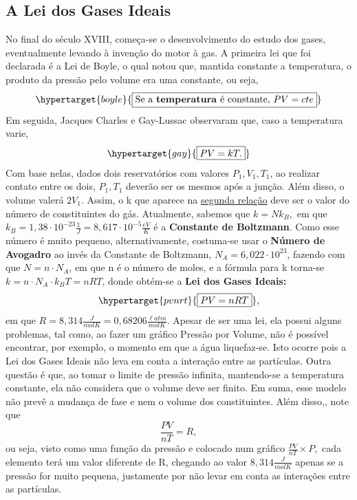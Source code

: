 \documentclass{article}
\begin{document}
\subsection{A Lei dos Gases Ideais}
  No final do século XVIII, começa-se o desenvolvimento do estudo dos gases, eventualmente levando à invenção do motor à gas. A primeira lei que foi declarada
é a Lei de Boyle, o qual notou que, mantida constante a temperatura, o produto da pressão pelo volume era uma constante, ou seja, 
  \[
    \hypertarget{boyle}{\boxed{\text{Se a \textbf{temperatura} é constante, }PV = cte}}
  \]
  Em seguida, Jacques Charles e Gay-Lussac observaram que, caso a temperatura varie, 
  \[
    \hypertarget{gay}{\boxed{PV = kT.}}
  \]
  Com base nelas, dados dois reservatórios com valores \(P_{1}, V_{1}, T_{1}\), ao realizar contato entre os dois, \(P_{1}, T_{1}\) deverão ser os mesmos após a junção.
Além disso, o volume valerá \(2V_{1}.\) Assim, o k que aparece na \hyperlink{gay}{segunda relação} deve ser o valor do número de constituintes do gás. Atualmente, sabemos que 
 \(k = Nk_{B},\) em que \(k_{B} = 1,38 \cdot 10^{-23}\frac{1}{J} = 8,617 \cdot 10^{-5}\frac{eV}{K}\) é a \textbf{Constante de Boltzmann}. Como esse número é muito pequeno, alternativamente,
costuma-se usar o \textbf{Número de Avogadro } ao invés da Constante de Boltzmann, \(N_{A} = 6,022 \cdot 10^{23}\), fazendo com que \(N = n \cdot N_{A}\), em que n é o número
de moles, e a fórmula para k torna-se \(k = n \cdot N_{A} \cdot k_{B} T = nRT\), donde obtém-se a \textbf{Lei dos Gases Ideais:}
  \[
    \hypertarget{pvnrt}{\boxed{PV = nRT}},
  \]
  em que \(R = 8,314 \frac{J}{molK} = 0,68206 \frac{\ell atm}{mol K}\). Apesar de ser uma lei, ela possui alguns problemas, tal como, ao fazer um gráfico Pressão por Volume,
não é possível encontrar, por exemplo, o momento em que a água liquefaz-se. Isto ocorre pois a Lei dos Gases Ideais não leva em conta a interação entre as partículas. Outra questão
é que, ao tomar o limite de pressão infinita, mantendo-se a temperatura constante, ela não considera que o volume deve ser finito. Em suma, esse modelo não prevê a mudança de fase
e nem o volume dos constituintes. Além disso,, note que 
  \[
    \frac{PV}{nT} = R,
  \]
  ou seja, visto como uma função da pressão e colocado num gráfico \(\frac{PV}{nT}\times P,\) cada elemento terá um valor diferente de R, chegando ao valor \(8,314 \frac{J}{mol K}\) apenas
se a pressão for muito pequena, justamente por não levar em conta as interações entre as partículas.
\end{document}
